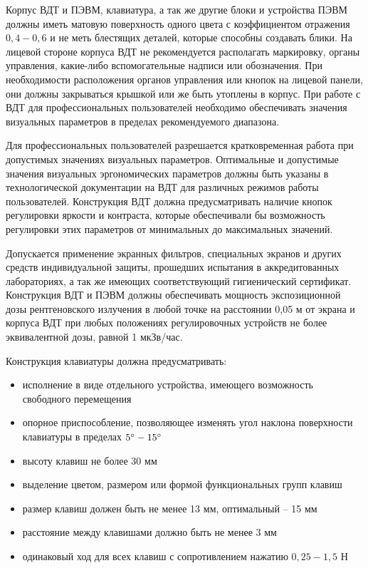 Корпус ВДТ и ПЭВМ, клавиатура, а так же другие блоки и устройства ПЭВМ должны
иметь матовую поверхность одного цвета с коэффициентом отражения $0,4 - 0,6$ и
не меть блестящих деталей, которые способны создавать блики. На лицевой стороне
корпуса ВДТ не рекомендуется располагать маркировку, органы управления, какие-либо вспомогательные надписи или обозначения.
При необходимости расположения органов управления или кнопок на лицевой панели,
они должны закрываться крышкой или же быть утоплены в корпус. При работе с ВДТ
для профессиональных пользователей необходимо обеспечивать значения визуальных
параметров в пределах рекомендуемого диапазона.

Для профессиональных пользователей разрешается кратковременная работа при допустимых
значениях визуальных параметров. Оптимальные и допустимые значения визуальных
эргономических параметров должны быть указаны в технологической документации на
ВДТ для различных режимов работы пользователей. Конструкция ВДТ должна предусматривать
наличие кнопок регулировки яркости и контраста, которые обеспечивали бы возможность
регулировки этих параметров от минимальных до максимальных значений.

Допускается применение экранных фильтров, специальных экранов и других средств
индивидуальной защиты, прошедших испытания в аккредитованных лабораториях, а так
же имеющих соответствующий гигиенический сертификат. Конструкция ВДТ и ПЭВМ должны
обеспечивать мощность экспозиционной дозы рентгеновского излучения в любой точке
на расстоянии 0,05 м от экрана и корпуса ВДТ при любых положениях регулировочных
устройств не более эквивалентной дозы, равной 1 мкЗв/час.

Конструкция клавиатуры должна предусматривать:

\begin{itemize}
    \item исполнение в виде отдельного устройства, имеющего возможность свободного
            перемещения
    \item опорное приспособление, позволяющее изменять угол наклона поверхности
            клавиатуры в пределах $5 \degree - 15 \degree$
    \item высоту клавиш не более 30 мм
    \item выделение цветом, размером или формой функциональных групп клавиш
    \item размер клавиш должен быть не менее 13 мм, оптимальный – 15 мм
    \item расстояние между клавишами должно быть не менее 3 мм
    \item одинаковый ход для всех клавиш с сопротивлением нажатию $0,25 - 1,5$ Н
\end{itemize}

